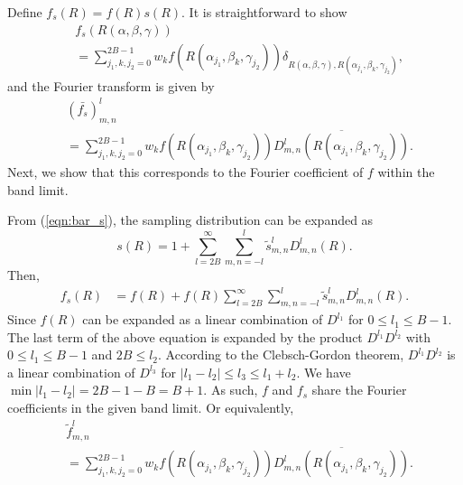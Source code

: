 \documentclass[onecolumn,11pt]{ieeetran}
\newcommand{\refeqn}[1]{(\ref{eqn:#1})}
\begin{document}
Define $f_s(R)=f(R) s(R)$. It is straightforward to show
\begin{align*}
&f_s(R(\alpha,\beta,\gamma))\\
& = 
\sum_{j_1,k,j_2=0}^{2B-1} w_k f(R(\alpha_{j_1},\beta_k,\gamma_{j_2})) 
\delta_{R(\alpha,\beta,\gamma),R(\alpha_{j_1},\beta_k,\gamma_{j_2})},
\end{align*}
and the Fourier transform is given by
\begin{align*}
&(\bar{f_s})^l_{m,n}\\
& = 
\sum_{j_1,k,j_2=0}^{2B-1} w_k f(R(\alpha_{j_1},\beta_k,\gamma_{j_2})) 
\overline{D^l_{m,n}(R(\alpha_{j_1},\beta_k,\gamma_{j_2}))}.
\end{align*}
Next, we show that this corresponds to the Fourier coefficient of $f$ within the band limit. 

From \refeqn{bar_s}, the sampling distribution can be expanded as
\[
s(R)=1+\sum_{l=2B}^\infty \sum_{m,n=-l}^l \tilde s^l_{m,n} D^l_{m,n}(R).
\]
Then,
\begin{align*}
f_s(R)&=f(R)+f(R)\sum_{l=2B}^\infty \sum_{m,n=-l}^l \tilde s^l_{m,n} D^l_{m,n}(R).
\end{align*}
Since $f(R)$ can be expanded as a linear combination of $D^{l_1}$ for $0\leq l_1 \leq B-1$. The last term of the above equation is expanded by the product $D^{l_1}D^{l_2}$ with $0\leq l_1 \leq B-1$  and $2B\leq l_2$. According to the Clebsch-Gordon theorem, $D^{l_1}D^{l_2}$ is a linear combination of $D^{l_3}$ for $|l_1-l_2|\leq l_3 \leq l_1+l_2$. We have $\min|l_1-l_2|=2B-1-B=B+1$. As such, $f$ and $f_s$ share the Fourier coefficients in the given band limit. Or equivalently, 
\begin{align}
&\tilde f^l_{m,n}\nonumber\\
& = 
\sum_{j_1,k,j_2=0}^{2B-1} w_k f(R(\alpha_{j_1},\beta_k,\gamma_{j_2})) 
\overline{D^l_{m,n}(R(\alpha_{j_1},\beta_k,\gamma_{j_2}))}.
\end{align}
\end{document}
